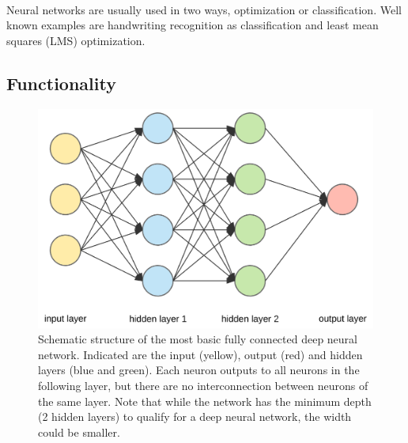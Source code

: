 			~\\
			Neural networks are usually used in two ways, optimization or classification. Well known examples are handwriting recognition as classification and least mean squares (LMS) optimization.
		\subsection{Functionality}
			\label{NNExample}
			
			\begin{figure}
				\includegraphics[width=\textwidth]{images/simpleNN.png}
				\caption{Schematic structure of the most basic fully connected deep neural network. Indicated are the input (yellow), output (red) and hidden layers (blue and green). Each neuron outputs to all neurons in the following layer, but there are no interconnection between neurons of the same layer. Note that while the network has the minimum depth (2 hidden layers) to qualify for a deep neural network, the width  could be smaller.}
				\label{Img_NNFully}
			\end{figure}

